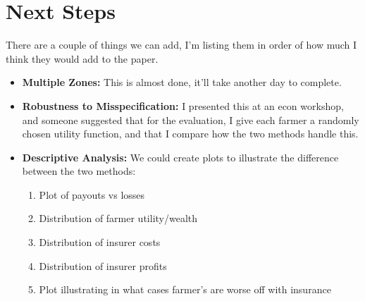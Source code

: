 \documentclass[11pt]{article}
\begin{document}
\section{Next Steps}
  There are a couple of things we can add, I'm listing them in order of how much I think they would add to the paper. 
\begin{itemize}
  \item \textbf{Multiple Zones:} This is almost done, it'll take another day to complete. 
  \item \textbf{Robustness to Misspecification:} I presented this at an econ workshop, and someone suggested that for the evaluation, I give each farmer a randomly chosen utility function, and that I compare how the two methods handle this. 
  \item \textbf{Descriptive Analysis:} We could create plots to illustrate the difference between the two methods: 
    \begin{enumerate}
      \item Plot of payouts vs losses
      \item Distribution of farmer utility/wealth
      \item Distribution of insurer costs
      \item Distribution of insurer profits
      \item Plot illustrating in what cases farmer's are worse off with insurance
    \end{enumerate}
\end{itemize}
\end{document}
